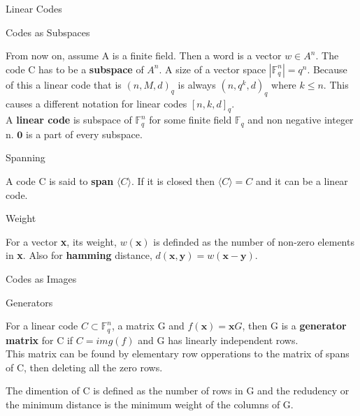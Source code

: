 \documentclass[12pt, letterpaper]{article}
\newcommand{\F}{\mathbb{F}}
\begin{document}
\begin{section}{Linear Codes}

  \begin{subsection}{Codes as Subspaces}

    From now on, assume A is a finite field. Then a word is a vector \(w \in
    A^{n}\). The code C has to be a \textbf{subspace} of \(A^{n}\). A size of a
    vector space \(| \F^{n}_{q} | = q^{n}\). Because of this a linear code that
    is \((n, M, d)_{q}\) is always \((n, q^{k}, d)_{q}\) where \(k \leq n\).
    This causes a different notation for linear codes \([n, k, d]_{q}\). \\
    A \textbf{linear code} is subspace of \(\F^{n}_{q}\) for some finite field
    \(\F_{q}\) and non negative integer n. \(\textbf{0}\) is a part of every
    subspace.

    \begin{subsubsection}{Spanning}

      A code C is said to \textbf{span} \(\langle C \rangle\). If it is closed
      then \(\langle C \rangle = C\) and it can be a linear code.

    \end{subsubsection}

    \begin{subsubsection}{Weight}

      For a vector \textbf{x}, its weight, \(w(\textbf{x})\) is definded as
      the number of non-zero elements in \textbf{x}. Also for \textbf{hamming}
      distance, \(d(\textbf{x}, \textbf{y}) = w(\textbf{x} - \textbf{y})\).

    \end{subsubsection}

  \end{subsection}

  \begin{subsection}{Codes as Images}

    \begin{subsubsection}{Generators}

      For a linear code \(C \subset \F^{n}_{q}\), a matrix G and \(f(\textbf{x})
      = \textbf{x} G\), then G is a \textbf{generator matrix} for C if \(C =
      img(f)\) and G has linearly independent rows. \\
      This matrix can be found by elementary row opperations to the matrix of
      spans of C, then deleting all the zero rows.

      The dimention of C is defined as the number of rows in G and the redudency
      or the minimum distance is the minimum weight of the columns of G.


\end{subsubsection}
\end{subsection}
\end{section}
\end{document}
